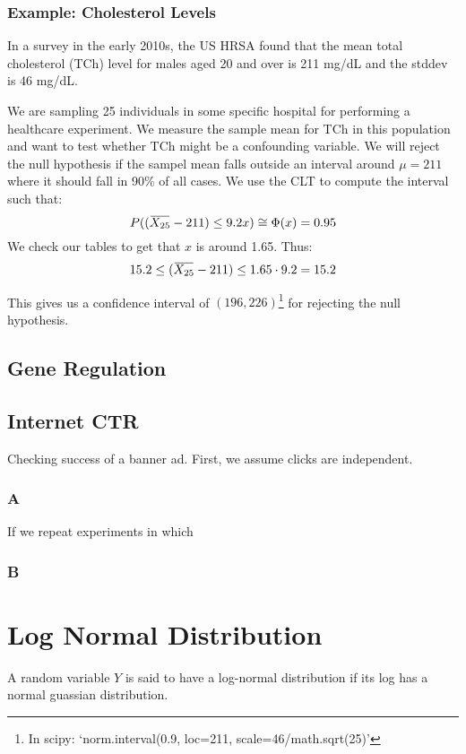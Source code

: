\documentclass[a4paper]{article}
\newcommand{\mean}[1]{\mkern 1.5mu\overline{\mkern-1.5mu#1\mkern-1.5mu}\mkern 1.5mu}
\begin{document}
\subsubsection{Example: Cholesterol Levels}
In a survey in the early 2010s, the US HRSA found that the mean total cholesterol (TCh) level for males aged 20 and over is 211 mg/dL and the stddev is 46 mg/dL.

We are sampling 25 individuals in some specific hospital for performing a healthcare experiment. We measure the sample mean for TCh in this population and want to test whether TCh might be a confounding variable. We will reject the null hypothesis if the sampel mean falls outside an interval around $\mu=211$ where it should fall in 90\% of all cases.
We use the CLT to compute the interval such that:
\[P((\mean{X_{25}}-211) \le 9.2x)\cong\Phi(x)=0.95\]
We check our tables to get that $x$ is around 1.65. Thus:
\[15.2 \le (\mean{X_{25}}-211)\le 1.65\cdot 9.2=15.2\]

This gives us a confidence interval of $(196,226)$\footnote{In scipy: `norm.interval(0.9, loc=211, scale=46/math.sqrt(25)'} for rejecting the null hypothesis.

\subsection{Gene Regulation}

\subsection{Internet CTR}
Checking success of a banner ad. First, we assume clicks are independent.


\subsubsection{A}
If we repeat experiments in which 
\subsubsection{B}

\section{Log Normal Distribution}
A random variable $Y$ is said to have a log-normal distribution if its log has a normal guassian distribution.
\end{document}
